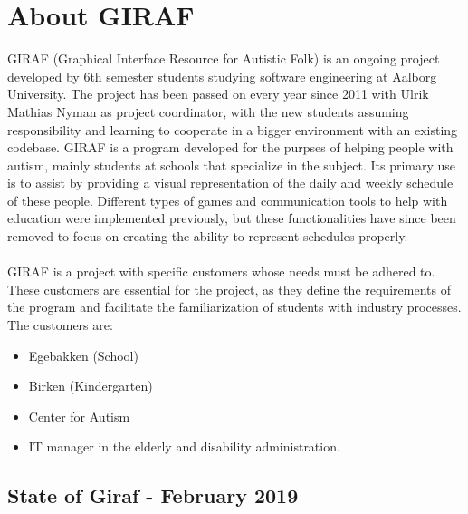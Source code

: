 \section{About GIRAF}
GIRAF (Graphical Interface Resource for Autistic Folk) is an ongoing project developed by 6th semester students studying software engineering at Aalborg University. 
The project has been passed on every year since 2011 with Ulrik Mathias Nyman as project coordinator, with the new students assuming responsibility and learning to cooperate in a bigger environment with an existing codebase. 
GIRAF is a program developed for the purpses of helping people with autism, mainly students at schools that specialize in the subject.
Its primary use is to assist by providing a visual representation of the daily and weekly schedule of these people.
Different types of games and communication tools to help with education were implemented previously, but these functionalities have since been removed to focus on creating the ability to represent schedules properly.
\\

\\
GIRAF is a project with specific customers whose needs must be adhered to. 
These customers are essential for the project, as they define the requirements of the program and facilitate the familiarization of students with industry processes.
The customers are: 
\begin{itemize}
    \item Egebakken (School)
    \item Birken (Kindergarten)
    \item Center for Autism
    \item IT manager in the elderly and disability administration.
\end{itemize}

\subsection{State of Giraf - February 2019}
